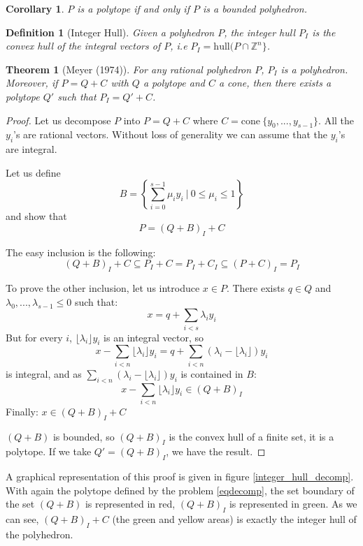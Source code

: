 \documentclass{article}
\newcommand{\cone}{\mathrm{cone}}
\newcommand{\hull}{\mathrm{hull}}
\newcommand{\ints}{\mathbb{Z}}
\newcommand{\ifff}{if and only if}
\newtheorem{definition}{Definition}
\newtheorem{theorem}{Theorem}
\newtheorem{corollary}{Corollary}
\begin{document}
\begin{corollary}
  $P$ is a polytope \ifff{} $P$ is a bounded polyhedron.
\end{corollary}

\begin{definition}[Integer Hull]
  Given a polyhedron $P$, the \textup{integer hull} $P_I$ is the convex hull of
  the integral vectors of $P$, i.e $P_I = \hull (P \cap \ints^n\}$.
\end{definition}

\begin{theorem}[Meyer (1974)]
\label{meyer theorem}
  For any rational polyhedron $P$, $P_I$ is a polyhedron. Moreover, if
  $P = Q + C$ with $Q$ a polytope and $C$ a cone, then there exists a polytope
  $Q'$ such that $P_I = Q' + C$.
\end{theorem}
\begin{proof}
  Let us decompose $P$ into $P = Q + C$ where
  $C = \cone~\{y_0, ..., y_{s-1}\}$. All the $y_i$'s are rational vectors.
  Without loss of generality we can assume that the $y_i$'s are integral.

  Let us define
  $$B = \left\{\sum_{i=0}^{s-1} \mu_i y_i~|~
               0 \leqslant \mu_i \leqslant 1\right\}$$
  and show that $$P = (Q + B)_I + C$$

  The easy inclusion is the following:
  $$(Q + B)_I + C \subseteq P_I + C = P_I + C_I \subseteq (P + C)_I = P_I$$

  To prove the other inclusion, let us introduce $x \in P$.
  There exists $q \in Q$ and $\lambda_0, ..., \lambda_{s-1}
  \leqslant 0$ such that: $$x = q + \sum_{i < s} \lambda_i y_i$$ But for every
  $i$, $\lfloor \lambda_i \rfloor y_i$ is an integral vector, so
  $$x - \sum_{i<n} \lfloor \lambda_i \rfloor y_i=
      q + \sum_{i<n} (\lambda_i - \lfloor \lambda_i \rfloor) y_i$$
  is integral, and as $\sum_{i<n} (\lambda_i - \lfloor \lambda_i \rfloor) y_i$
  is contained in $B$:
  $$x - \sum_{i<n} \lfloor \lambda_i \rfloor y_i \in (Q + B)_I$$
  Finally: $x \in (Q + B)_I + C$

  $(Q + B)$ is bounded, so $(Q + B)_I$ is the convex hull of a finite set, it is
  a polytope. If we take $Q' = (Q + B)_I$, we have the result.
\end{proof}

A graphical representation of this proof is given in figure
\ref{integer_hull_decomp}. With again the polytope defined by the problem
\ref{eqdecomp}, the set boundary of the set $(Q + B)$ is represented
in red, $(Q + B)_I$ is represented in green. As we can see, $(Q + B)_I + C$ (the
green and yellow areas) is exactly the integer hull of the polyhedron.
\end{document}
